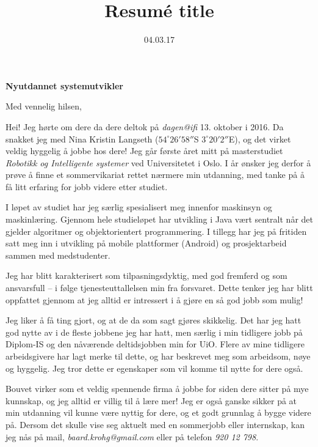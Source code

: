 \documentclass[11pt,a4paper,sans]{moderncv}        %
\title{Resumé title}                               %
\begin{document}

\date{04.03.17}
\opening{\large\textbf{Nyutdannet systemutvikler}}
\closing{Med vennelig hilsen,}

\makelettertitle

Hei! Jeg hørte om dere da dere deltok på \emph{dagen@ifi} 13. oktober i 2016. Da snakket jeg med Nina Kristin Langseth ($54^{\circ}26'58''$S $3^{\circ}20'2''$E), og det virket veldig hyggelig å jobbe hos dere! Jeg går første året mitt på masterstudiet \emph{Robotikk og Intelligente systemer} ved Universitetet i Oslo. I år ønsker jeg derfor å prøve å finne et sommervikariat rettet nærmere min utdanning, med tanke på å få litt erfaring for jobb videre etter studiet.

I løpet av studiet har jeg særlig spesialisert meg innenfor maskinsyn og maskinlæring. Gjennom hele studieløpet har utvikling i Java vært sentralt når det gjelder algoritmer og objektorientert programmering. I tillegg har jeg på fritiden satt meg inn i utvikling på mobile plattformer (Android) og prosjektarbeid sammen med medstudenter.

Jeg har blitt karakterisert som tilpasningsdyktig, med god fremferd og som ansvarsfull -- i følge tjenesteuttallelsen min fra forsvaret. Dette tenker jeg har blitt oppfattet gjennom at jeg alltid er intressert i å gjøre en så god jobb som mulig!

Jeg liker å få ting gjort, og at de da som sagt gjøres skikkelig. Det har jeg hatt god nytte av i de fleste jobbene jeg har hatt, men særlig i min tidligere jobb på Diplom-IS og den nåværende deltidsjobben min for UiO. Flere av mine tidligere arbeidsgivere har lagt merke til dette, og har beskrevet meg som arbeidsom, nøye og hyggelig.
Jeg tror dette er egenskaper som vil komme til nytte for dere også.

Bouvet virker som et veldig spennende firma å jobbe for siden dere sitter på mye kunnskap, og jeg alltid er villig til å lære mer! Jeg er også ganske sikker på at min utdanning vil kunne være nyttig for dere, og et godt grunnlag å bygge videre på. Dersom det skulle vise seg aktuelt med en sommerjobb eller internskap, kan jeg nås på mail, \emph{baard.krohg@gmail.com} eller på telefon \emph{920 12 798}.

\makeletterclosing
\end{document}
